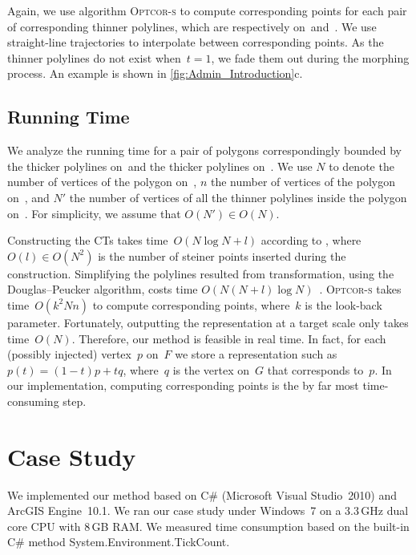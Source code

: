 Again, we use algorithm \textsc{Optcor-s} 
to compute corresponding points
for each pair of corresponding thinner polylines, 
which are respectively on~\ml and~\ms. 
We use straight-line trajectories
to interpolate between corresponding points. 
As the thinner polylines do not exist when~$t=1$, 
we fade them out during the morphing process. 
An example is shown in \fig\ref{fig:Admin_Introduction}c.

\subsection{Running Time}
\label{sec:Admin_Runningtime} 

We analyze the running time for a pair of polygons correspondingly bounded by 
the thicker polylines on~\ml and the thicker polylines on~\ms. 
We use $N$ to denote 
the number of vertices of the polygon on~\ml, 
$n$ the number of vertices of the polygon on~\ms, 
and $N'$ the number of vertices of all the thinner polylines 
inside the polygon on~\ml. 
For simplicity, we assume that $O(N')\in O(N)$.

Constructing the CTs takes time~$O(N\log N + l)$ 
according to \textcite{AronovSS93}, 
where~$O(l)\in O(N^2)$ is the number of steiner points 
inserted during the construction.
Simplifying the polylines resulted from transformation, 
using the Douglas--Peucker algorithm, 
costs time 
$O(N(N+l)\log{N})$~\parencite{Hershberger92speedingup}.  
\textsc{Optcor-s} takes time~$O(k^2Nn)$ 
to compute corresponding points, 
where~$k$ is the look-back parameter. 
Fortunately, outputting the representation at a target scale 
only takes time~$O(N)$.
Therefore, our method is feasible in real time. 
In fact, for each (possibly injected) vertex~$p$ on~$F$ 
we store a representation such as~$p(t)=(1-t)p+tq$,
where~$q$ is the vertex on~$G$ that corresponds to~$p$. 
In our implementation, computing corresponding points
is the by far most time-consuming step.



\section{Case Study}
\label{sec:Admin_CaseStudy}

We implemented our method based on 
C\# (Microsoft Visual Studio~2010) and ArcGIS Engine~10.1. 
We ran our case study under 
Windows~7 on a $3.3\,$GHz dual core CPU with $8\,$GB RAM. 
We measured time consumption based on the
built-in C\# method System.Environment.TickCount.

